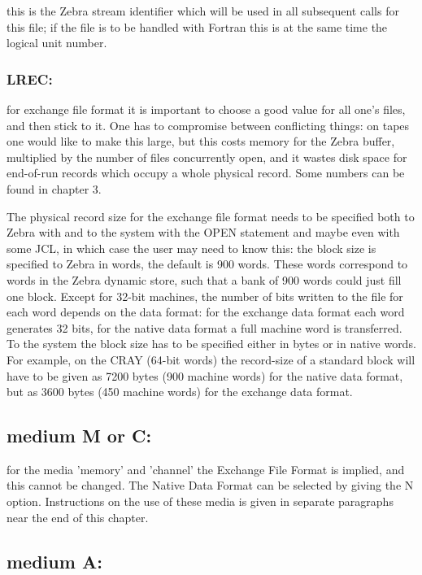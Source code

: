 this is the Zebra stream identifier which will be used in all subsequent
calls for this file; if the file is to be handled with Fortran this
is at the same time the logical unit number.

\subsubsection*{LREC:}

for exchange file format it is important to choose a good value for
all one's files, and then stick to it.
One has to compromise between conflicting things:
on tapes one would like to make this large,
but this costs memory for the Zebra buffer,
multiplied by the number of files concurrently open,
and it wastes disk space for end-of-run records which occupy
a whole physical record.
Some numbers can be found in chapter 3.

The physical record size for the exchange file format needs to be
specified both to Zebra with  and to the system with the OPEN
statement and maybe even with some JCL,
in which case the user may need to know this:
the block size is specified to Zebra in words, the default is 900 words.
These words correspond to words in the Zebra dynamic store,
such that a bank of 900 words could just fill one block.
Except for 32-bit machines,
the number of bits written to the file for each word depends
on the data format: for the exchange data format each word
generates 32 bits, for the native data format a full machine word
is transferred.
To the system the block size has to be specified either in bytes
or in native words.
For example, on the CRAY (64-bit words) the record-size of
a standard block will have to be given as 7200 bytes
(900 machine words) for the native data format,
but as 3600 bytes (450 machine words) for the exchange data format.

\subsection*{medium M or C:}

for the media 'memory' and 'channel' the Exchange File Format
is implied, and this cannot be changed.
The Native Data Format can be selected by giving the N option.
Instructions on the use of these media is given in separate
paragraphs near the end of this chapter.

\subsection*{medium A:}

